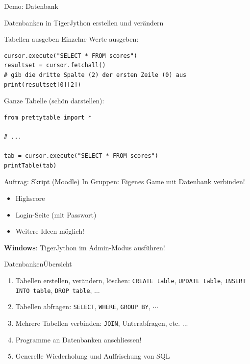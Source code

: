 \begin{frame}[fragile]{Demo: Datenbank}
\begin{center}
Datenbanken in TigerJython erstellen und verändern
\end{center}
\end{frame}

\begin{frame}[fragile]{Tabellen ausgeben}
Einzelne Werte ausgeben:
\begin{lstlisting}[style=Python]
cursor.execute("SELECT * FROM scores")
resultset = cursor.fetchall()
# gib die dritte Spalte (2) der ersten Zeile (0) aus
print(resultset[0][2])
\end{lstlisting}

Ganze Tabelle (schön darstellen):
\begin{lstlisting}[style=Python]
from prettytable import *

# ...

tab = cursor.execute("SELECT * FROM scores")
printTable(tab)
\end{lstlisting}


\end{frame}

\begin{frame}[fragile]{Auftrag: Skript (Moodle)}
In Gruppen: Eigenes Game mit Datenbank verbinden!
\begin{itemize}
\item Highscore
\item Login-Seite (mit Passwort)
\item Weitere Ideen möglich!
\end{itemize}
\begin{myattention}
\faWindows{} \textbf{Windows}: TigerJython im Admin-Modus ausführen!
\end{myattention}
\end{frame}

\begin{frame}{Datenbanken}{Übersicht}
	\begin{enumerate}
		\item \faCheckSquare{} Tabellen erstellen, verändern, löschen: \lstinline|CREATE table|, \lstinline|UPDATE table|, \lstinline|INSERT INTO table|, \lstinline|DROP table|, $\ldots$
		\item \faCheckSquare{} Tabellen abfragen: \lstinline|SELECT|, \lstinline|WHERE|, \lstinline|GROUP BY|, $\cdots$
		\item \faCheckSquare{} Mehrere Tabellen verbinden: \lstinline|JOIN|, Unterabfragen, etc. ...
		\item \faCheckSquare{} Programme an Datenbanken anschliessen!
		\item \faSquare{} Generelle Wiederholung und Auffrischung von SQL 
	\end{enumerate}
\end{frame}

